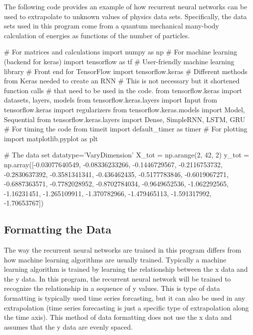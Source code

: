 \documentclass[%
oneside,                 %
final,                   %
10pt]{article}
\begin{document}
The following code provides an example of how recurrent neural
networks can be used to extrapolate to unknown values of physics data
sets.  Specifically, the data sets used in this program come from
a quantum mechanical many-body calculation of energies as functions of the number of particles.































\bpycod

# For matrices and calculations
import numpy as np
# For machine learning (backend for keras)
import tensorflow as tf
# User-friendly machine learning library
# Front end for TensorFlow
import tensorflow.keras
# Different methods from Keras needed to create an RNN
# This is not necessary but it shortened function calls 
# that need to be used in the code.
from tensorflow.keras import datasets, layers, models
from tensorflow.keras.layers import Input
from tensorflow.keras import regularizers
from tensorflow.keras.models import Model, Sequential
from tensorflow.keras.layers import Dense, SimpleRNN, LSTM, GRU
# For timing the code
from timeit import default_timer as timer
# For plotting
import matplotlib.pyplot as plt


# The data set
datatype='VaryDimension'
X_tot = np.arange(2, 42, 2)
y_tot = np.array([-0.03077640549, -0.08336233266, -0.1446729567, -0.2116753732, -0.2830637392, -0.3581341341, -0.436462435, -0.5177783846,
	-0.6019067271, -0.6887363571, -0.7782028952, -0.8702784034, -0.9649652536, -1.062292565, -1.16231451, 
	-1.265109911, -1.370782966, -1.479465113, -1.591317992, -1.70653767])


\epycod


\subsection{Formatting the Data}

The way the recurrent neural networks are trained in this program
differs from how machine learning algorithms are usually trained.
Typically a machine learning algorithm is trained by learning the
relationship between the x data and the y data.  In this program, the
recurrent neural network will be trained to recognize the relationship
in a sequence of y values.  This is type of data formatting is
typically used time series forcasting, but it can also be used in any
extrapolation (time series forecasting is just a specific type of
extrapolation along the time axis).  This method of data formatting
does not use the x data and assumes that the y data are evenly spaced.
\end{document}

